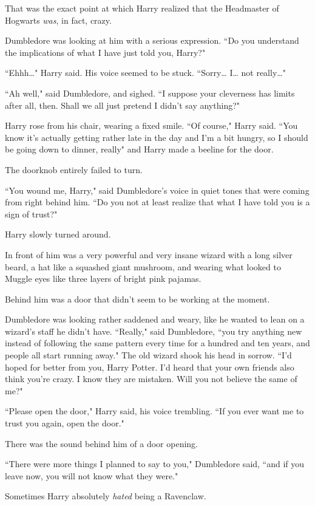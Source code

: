 That was the exact point at which Harry realized that the Headmaster of Hogwarts \emph{was}, in fact, crazy.

Dumbledore was looking at him with a serious expression. ``Do you understand the implications of what I have just told you, Harry?"

``Ehhh{\ldots}" Harry said. His voice seemed to be stuck. ``Sorry{\ldots} I{\ldots} not really{\ldots}"

``Ah well," said Dumbledore, and sighed. ``I suppose your cleverness has limits after all, then. Shall we all just pretend I didn't say anything?"

Harry rose from his chair, wearing a fixed smile. ``Of course," Harry said. ``You know it's actually getting rather late in the day and I'm a bit hungry, so I should be going down to dinner, really" and Harry made a beeline for the door.

The doorknob entirely failed to turn.

``You wound me, Harry," said Dumbledore's voice in quiet tones that were coming from right behind him. ``Do you not at least realize that what I have told you is a sign of trust?"

Harry slowly turned around.

In front of him was a very powerful and very insane wizard with a long silver beard, a hat like a squashed giant mushroom, and wearing what looked to Muggle eyes like three layers of bright pink pajamas.

Behind him was a door that didn't seem to be working at the moment.

Dumbledore was looking rather saddened and weary, like he wanted to lean on a wizard's staff he didn't have. ``Really," said Dumbledore, ``you try anything new instead of following the same pattern every time for a hundred and ten years, and people all start running away." The old wizard shook his head in sorrow. ``I'd hoped for better from you, Harry Potter. I'd heard that your own friends also think you're crazy. I know they are mistaken. Will you not believe the same of me?"

``Please open the door," Harry said, his voice trembling. ``If you ever want me to trust you again, open the door."

There was the sound behind him of a door opening.

``There were more things I planned to say to you," Dumbledore said, ``and if you leave now, you will not know what they were."

Sometimes Harry absolutely \emph{hated} being a Ravenclaw.


